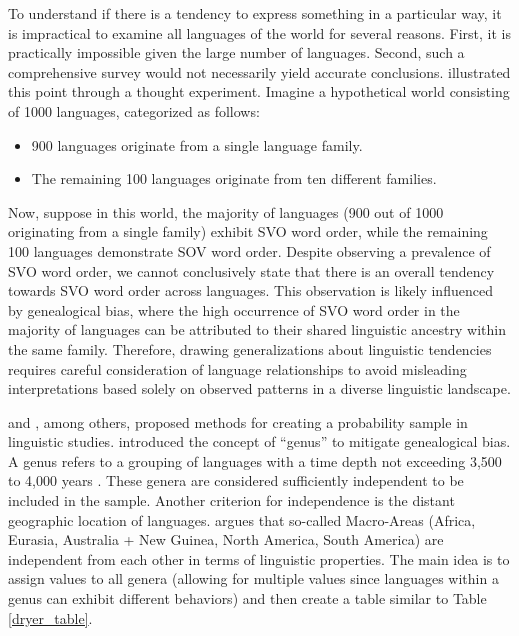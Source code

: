 To understand if there is a tendency to express something in a particular way, it is impractical to examine all languages of the world for several reasons. First, it is practically impossible given the large number of languages. Second, such a comprehensive survey would not necessarily yield accurate conclusions. \cite{dryer1989large} illustrated this point through a thought experiment. Imagine a hypothetical world consisting of 1000 languages, categorized as follows:

\begin{itemize}
	\item 900 languages originate from a single language family.
	\item The remaining 100 languages originate from ten different families.
\end{itemize}

Now, suppose in this world, the majority of languages (900 out of 1000 originating from a single family) exhibit SVO word order, while the remaining 100 languages demonstrate SOV word order. Despite observing a prevalence of SVO word order, we cannot conclusively state that there is an overall tendency towards SVO word order across languages. This observation is likely influenced by genealogical bias, where the high occurrence of SVO word order in the majority of languages can be attributed to their shared linguistic ancestry within the same family. Therefore, drawing generalizations about linguistic tendencies requires careful consideration of language relationships to avoid misleading interpretations based solely on observed patterns in a diverse linguistic landscape.


\citet{dryer1989large} and \citet{bickel2008refined}, among others, proposed methods for creating a probability sample in linguistic studies. \citet{dryer1989large} introduced the concept of ``genus'' to mitigate genealogical bias. A genus refers to a grouping of languages with a time depth not exceeding 3,500 to 4,000 years \citep{dryer1989large}. These genera are considered sufficiently independent to be included in the sample. Another criterion for independence is the distant geographic location of languages. \citet{dryer1989large} argues that so-called Macro-Areas (Africa, Eurasia, Australia + New Guinea, North America, South America) are independent from each other in terms of linguistic properties. The main idea is to assign values to all genera (allowing for multiple values since languages within a genus can exhibit different behaviors) and then create a table similar to Table \ref{dryer_table}.

